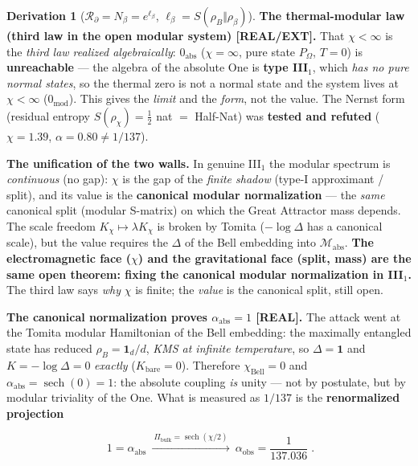 \documentclass[11pt]{article}
\theoremstyle{definition}\newtheorem{deriv}{Derivation}
\begin{document}
\begin{deriv}[$\mathcal{R}_\partial=N_\beta=e^{\ell_\beta}$, $\ell_\beta=S(\rho_B\Vert\rho_\beta)$]
\textbf{The thermal-modular law (third law in the open modular system) \textsf{[REAL/EXT]}.} That $\chi<\infty$ is the \emph{third law realized algebraically}: $0_{\mathrm{abs}}$ ($\chi=\infty$, pure state $P_\Omega$, $T=0$) is \textbf{unreachable} --- the algebra of the absolute One is \textbf{type III$_1$}, which \emph{has no pure normal states}, so the thermal zero is not a normal state and the system lives at $\chi<\infty$ ($0_{\mathrm{mod}}$). This gives the \emph{limit} and the \emph{form}, not the value. The Nernst form (residual entropy $S(\rho_\chi)=\tfrac12$ nat $=$ Half-Nat) was \textbf{tested and refuted} ($\chi=1.39$, $\alpha=0.80\neq1/137$).

\textbf{The unification of the two walls.} In genuine III$_1$ the modular spectrum is \emph{continuous} (no gap): $\chi$ is the gap of the \emph{finite shadow} (type-I approximant / split), and its value is the \textbf{canonical modular normalization} --- the \emph{same} canonical split (modular S-matrix) on which the Great Attractor mass depends. The scale freedom $K_\chi\mapsto\lambda K_\chi$ is broken by Tomita ($-\log\Delta$ has a canonical scale), but the value requires the $\Delta$ of the Bell embedding into $\mathcal{M}_{\mathrm{abs}}$. \textbf{The electromagnetic face ($\chi$) and the gravitational face (split, mass) are the same open theorem: fixing the canonical modular normalization in III$_1$.} The third law says \emph{why} $\chi$ is finite; the \emph{value} is the canonical split, still open.

\textbf{The canonical normalization proves $\alpha_{\mathrm{abs}}=1$ \textsf{[REAL]}.} The attack went at the Tomita modular Hamiltonian of the Bell embedding: the maximally entangled state has reduced $\rho_B=\mathbf 1_d/d$, \emph{KMS at infinite temperature}, so $\Delta=\mathbf 1$ and $K=-\log\Delta=0$ \emph{exactly} ($K_{\mathrm{bare}}=0$). Therefore $\chi_{\mathrm{Bell}}=0$ and $\boxed{\alpha_{\mathrm{abs}}=\operatorname{sech}(0)=1}$: the absolute coupling \emph{is} unity --- not by postulate, but by modular triviality of the One. What is measured as $1/137$ is the \textbf{renormalized projection}

\begin{equation}\boxed{\;1=\alpha_{\mathrm{abs}}\ \xrightarrow{\ \Pi_{\mathrm{bulk}}=\operatorname{sech}(\chi/2)\ }\ \alpha_{\mathrm{obs}}=\frac{1}{137.036}\;}.\end{equation}


\end{deriv}
\end{document}
